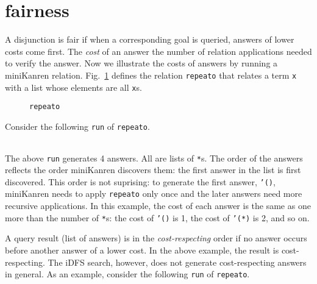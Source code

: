 \documentclass[format=acmlarge, review=true, authordraft=true]{acmart}
\begin{document}
\section{fairness}


A disjunction is fair if when a corresponding goal is queried, answers of 
lower costs come first. The \emph{cost} of an answer the number of relation 
applications needed to verify the answer. Now we illustrate the costs of answers 
by running a miniKanren relation. Fig.~\ref{def-repeato} defines the relation 
\texttt{repeato} that relates a term \texttt{x} with a list whose elements are 
all \texttt{x}s.


\begin{figure}
  
  \caption{\texttt{repeato}}
  \label{def-repeato}
\end{figure}

Consider the following \texttt{run} of \texttt{repeato}.
\begin{center}
  \begin{tabular}{c}
  
   \end{tabular}
\end{center}

The above \texttt{run} generates 4 answers. All are lists of \texttt{*}s.
The order of the answers reflects the order miniKanren discovers them:
the first answer in the list is first discovered. This order is not suprising:
to generate the first answer, \texttt{'()}, miniKanren needs to apply
\texttt{repeato} only once and the later answers need more recursive
applications. In this example, the cost of each answer is the same as
one more than the number of \texttt{*}s: the cost of \texttt{'()} is 1,
the cost of \texttt{'(*)} is 2, and so on.

A query result (list of answers) is in the \emph{cost-respecting} order if no 
answer occurs before another answer of a lower cost. In the above example, the 
result is cost-respecting. The iDFS search, however, does not generate 
cost-respecting answers in general. As an example, consider the following 
\texttt{run} of \texttt{repeato}.
\end{document}
